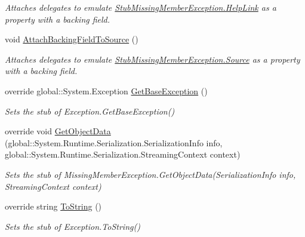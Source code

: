 \begin{DoxyCompactItemize}
\begin{DoxyCompactList}\small\item\em Attaches delegates to emulate \hyperlink{class_system_1_1_fakes_1_1_stub_missing_member_exception_a4cf9150a58dad34cb1cdce51372b41ce}{Stub\-Missing\-Member\-Exception.\-Help\-Link} as a property with a backing field.\end{DoxyCompactList}\item 
void \hyperlink{class_system_1_1_fakes_1_1_stub_missing_member_exception_a24d568b943afd906ffd313b631552051}{Attach\-Backing\-Field\-To\-Source} ()
\begin{DoxyCompactList}\small\item\em Attaches delegates to emulate \hyperlink{class_system_1_1_fakes_1_1_stub_missing_member_exception_a953ee210396eac9dd64cd554d87f422b}{Stub\-Missing\-Member\-Exception.\-Source} as a property with a backing field.\end{DoxyCompactList}\item 
override global\-::\-System.\-Exception \hyperlink{class_system_1_1_fakes_1_1_stub_missing_member_exception_ac27d7e2a1269cdb1f37623f29492075b}{Get\-Base\-Exception} ()
\begin{DoxyCompactList}\small\item\em Sets the stub of Exception.\-Get\-Base\-Exception()\end{DoxyCompactList}\item 
override void \hyperlink{class_system_1_1_fakes_1_1_stub_missing_member_exception_a74c3ec9ca5453b1aa80b5dba00248e5a}{Get\-Object\-Data} (global\-::\-System.\-Runtime.\-Serialization.\-Serialization\-Info info, global\-::\-System.\-Runtime.\-Serialization.\-Streaming\-Context context)
\begin{DoxyCompactList}\small\item\em Sets the stub of Missing\-Member\-Exception.\-Get\-Object\-Data(\-Serialization\-Info info, Streaming\-Context context)\end{DoxyCompactList}\item 
override string \hyperlink{class_system_1_1_fakes_1_1_stub_missing_member_exception_aece255535ba138dc2034501c9a9b8846}{To\-String} ()
\begin{DoxyCompactList}\small\item\em Sets the stub of Exception.\-To\-String()\end{DoxyCompactList}\end{DoxyCompactItemize}
